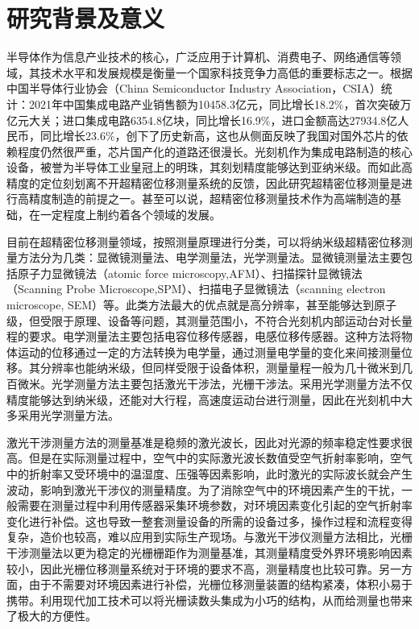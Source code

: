 \documentclass[type=master,oneside]{fduthesis}
\begin{document}
\section{研究背景及意义}
半导体作为信息产业技术的核心，广泛应用于计算机、消费电子、网络通信等领域，其技术水平和发展规模是衡量一个国家科技竞争力高低的重要标志之一。根据中国半导体行业协会（China Semiconductor Industry Association，CSIA）\cite{csia}统计：2021年中国集成电路产业销售额为10458.3亿元，同比增长18.2$\%$，首次突破万亿元大关；进口集成电路6354.8亿块，同比增长16.9$\%$，进口金额高达27934.8亿人民币，同比增长23.6$\%$，创下了历史新高，这也从侧面反映了我国对国外芯片的依赖程度仍然很严重，芯片国产化的道路还很漫长。光刻机作为集成电路制造的核心设备，被誉为半导体工业皇冠上的明珠\cite{2014国家集成电路产业发展推进纲要}，其刻划精度能够达到亚纳米级。而如此高精度的定位刻划离不开超精密位移测量系统的反馈，因此研究超精密位移测量是进行高精度制造的前提之一\cite{castenmiller2010towards,schmidt2012ultra}。甚至可以说，超精密位移测量技术作为高端制造的基础，在一定程度上制约着各个领域的发展。

目前在超精密位移测量领域，按照测量原理进行分类，可以将纳米级超精密位移测量方法分为几类：显微镜测量法、电学测量法，光学测量法。显微镜测量法主要包括原子力显微镜法（atomic force microscopy,AFM）\cite{meli1998long,misumi2005sub}、扫描探针显微镜法（Scanning Probe Microscope,SPM）\cite{kramar2010scanning,salapaka2008scanning,dai2005accurate}、扫描电子显微镜法（scanning electron microscope, SEM）\cite{zhou2008large}等。此类方法最大的优点就是高分辨率，甚至能够达到原子级，但受限于原理、设备等问题，其测量范围小，不符合光刻机内部运动台对长量程的要求。电学测量法主要包括电容位移传感器\cite{曹妍2019基于膜电极的电容微位移传感器研究与设计}，电感位移传感器\cite{刘敏2019双向电感微位移传感技术研究}。这种方法将物体运动的位移通过一定的方法转换为电学量，通过测量电学量的变化来间接测量位移。其分辨率也能纳米级，但同样受限于设备体积，测量量程一般为几十微米到几百微米。光学测量方法\cite{程晓辉1999光学纳米测量方法及发展趋势,engelhardt1996absolute}主要包括激光干涉法，光栅干涉法。采用光学测量方法不仅精度能够达到纳米级，还能对大行程，高速度运动台进行测量，因此在光刻机中大多采用光学测量方法。

激光干涉测量方法\cite{ye2019real}的测量基准是稳频的激光波长，因此对光源的频率稳定性要求很高。但是在实际测量过程中，空气中的实际激光波长数值受空气折射率影响，空气中的折射率又受环境中的温湿度、压强等因素影响，此时激光的实际波长就会产生波动，影响到激光干涉仪的测量精度。为了消除空气中的环境因素产生的干扰，一般需要在测量过程中利用传感器采集环境参数，对环境因素变化引起的空气折射率变化进行补偿。这也导致一整套测量设备的所需的设备过多，操作过程和流程变得复杂，造价也较高，难以应用到实际生产现场\cite{2000New}。与激光干涉仪测量方法相比，光栅干涉测量法\cite{hu2019displacement,lee2007optical}以更为稳定的光栅栅距作为测量基准，其测量精度受外界环境影响因素较小，因此光栅位移测量系统对于环境的要求不高，测量精度也比较可靠。另一方面，由于不需要对环境因素进行补偿，光栅位移测量装置的结构紧凑，体积小易于携带。利用现代加工技术可以将光栅读数头集成为小巧的结构，从而给测量也带来了极大的方便性。
\end{document}
